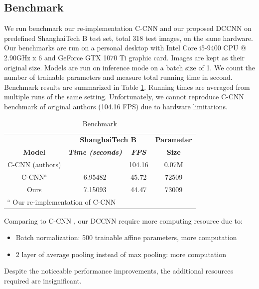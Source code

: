 
\subsection{Benchmark}

We run benchmark our re-implementation C-CNN \cite{9053780} and our proposed DCCNN on predefined ShanghaiTech B test set, total 318 test images, on the same hardware. Our benchmarks are run on a personal desktop with Intel Core i5-9400 CPU @ 2.90GHz x 6 and GeForce GTX 1070 Ti graphic card. Images are kept as their original size. Models are run on inference mode on a batch size of 1. We count the number of trainable parameters and measure total running time in second. Benchmark results are summarized in Table \ref{tab:benchmark-result}. Running times are averaged from multiple runs of the same setting. Unfortunately, we cannot reproduce C-CNN benchmark of original authors \cite{9053780} (104.16 FPS) due to hardware limitations. 

\begin{table}[htbp]
\caption{\label{tab:benchmark-result}  Benchmark}
\begin{center}
\begin{tabular}{|c|c|c|c|}
\hline
\textbf{}&\multicolumn{2}{|c|}{\textbf{ShanghaiTech B}}&\textbf{Parameter} \\
\cline{1-3}
\textbf{Model} & \textbf{\textit{ Time (seconds) }}& \textbf{\textit{FPS}}&\textbf{Size} \\
\hline
C-CNN (authors) \cite{9053780} &  &  104.16 & 0.07M \\
\hline
C-CNN$^{\mathrm{a}}$  & 6.95482 & 45.72 & 72509   \\
\hline
Ours &  7.15093 & 44.47 & 73009 \\
\hline
\multicolumn{4}{l}{$^{\mathrm{a}}$ Our re-implementation of C-CNN \cite{9053780}}
\end{tabular}

\end{center}
\end{table}

Comparing to C-CNN \cite{9053780}, our DCCNN require more computing resource due to: 
\begin{itemize}
    \item Batch normalization: 500 trainable affine parameters, more computation
    \item 2 layer of average pooling instead of max pooling: more computation 
\end{itemize}

Despite the noticeable performance improvements, the additional resources required are insignificant.